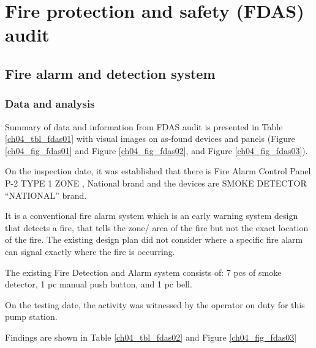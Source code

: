 \section{Fire protection and safety (FDAS) audit} \label{ch04fdas}


\subsection{Fire alarm and detection system} \label{ch04fdas01}
\subsubsection{Data and analysis}
Summary of data and information from FDAS audit is presented in Table \ref{ch04_tbl_fdas01} with visual images on as-found devices and panels (Figure \ref{ch04_fig_fdas01} and Figure \ref{ch04_fig_fdas02}, and Figure \ref{ch04_fig_fdas03}).







On the inspection date, it was established that there is Fire Alarm Control Panel P-2 TYPE 1 ZONE , National brand  and the devices are SMOKE DETECTOR “NATIONAL” brand. 

It is a conventional fire alarm system which is an early warning system design that detects a fire, that tells the zone/ area of the fire but not the exact location of the fire. The existing design plan did not consider where a specific fire alarm can signal exactly where the fire is occurring.

The existing Fire Detection and Alarm system consists of: 7 pcs of smoke detector, 1 pc manual push button, and 
1 pc bell. 

On the testing date, the activity was witnessed by the operator on duty for this pump station.

Findings are shown in Table \ref{ch04_tbl_fdas02} and Figure \ref{ch04_fig_fdas03}






